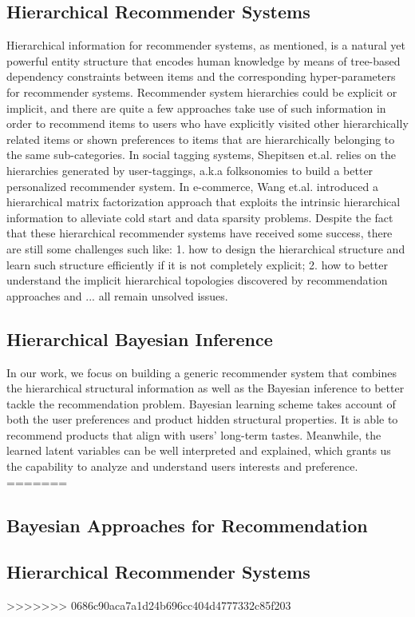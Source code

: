 \subsection{Hierarchical Recommender Systems}
Hierarchical information for recommender systems, as mentioned, is a natural yet powerful entity structure that encodes human knowledge by means of tree-based dependency constraints between items and the corresponding hyper-parameters for recommender systems.  Recommender system hierarchies could be explicit or implicit, and there are quite a few approaches take use of such information in order to recommend items to users who have explicitly visited other hierarchically related items or shown preferences to items that are hierarchically belonging to the same sub-categories.  In social tagging systems, Shepitsen et.al. \cite{shepitsen2008personalized} relies on the hierarchies generated by user-taggings, a.k.a folksonomies to build a better personalized recommender system.  In e-commerce, Wang et.al. \cite{wang2018exploring} introduced a hierarchical matrix factorization approach that exploits the intrinsic hierarchical information to alleviate cold start and data sparsity problems.  Despite the fact that these hierarchical recommender systems have received some success, there are still some challenges such like: 1. how to design the hierarchical structure and learn such structure efficiently if it is not completely explicit; 2. how to better understand the implicit hierarchical topologies discovered by recommendation approaches and ... all remain unsolved issues.

\subsection{Hierarchical Bayesian Inference}
In our work, we focus on building a generic recommender system that combines the hierarchical structural information as well as the Bayesian inference to better tackle the recommendation problem.  Bayesian learning scheme takes account of both the user preferences and product hidden structural properties. It is able to recommend products that align with users' long-term tastes. Meanwhile, the learned latent variables can be well interpreted and explained, which grants us the capability to analyze and understand users interests and preference.
=======

\subsection{Bayesian Approaches for Recommendation}


\subsection{Hierarchical Recommender Systems}


>>>>>>> 0686c90aca7a1d24b696cc404d4777332c85f203
